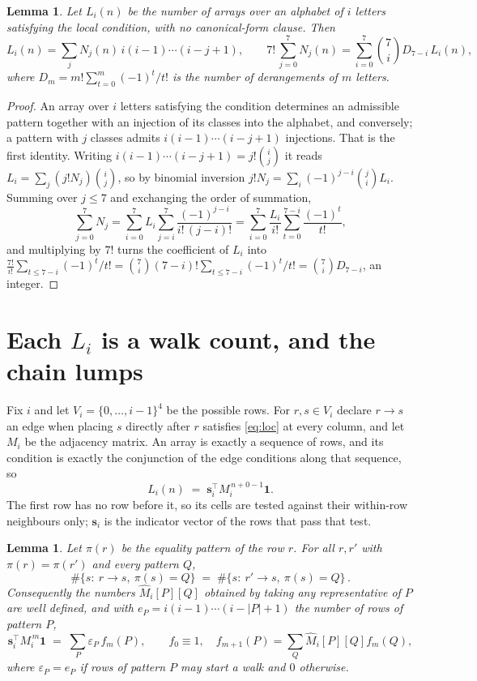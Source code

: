 \documentclass[11pt,a4paper]{article}
\theoremstyle{plain}
\newtheorem{lemma}[theorem]{Lemma}
\theoremstyle{definition}
\begin{document}
\begin{lemma}\label{lem:inv}
Let $L_i(n)$ be the number of arrays over an alphabet of $i$ letters satisfying the local
condition, with no canonical-form clause. Then
\[
L_i(n)=\sum_j N_j(n)\,i(i-1)\cdots(i-j+1),
\qquad
7!\,\sum_{j=0}^{7}N_j(n)=\sum_{i=0}^{7}\binom{7}{i}D_{7-i}\,L_i(n),
\]
where $D_m=m!\sum_{t=0}^{m}(-1)^t/t!$ is the number of derangements of $m$ letters.
\end{lemma}

\begin{proof}
An array over $i$ letters satisfying the condition determines an admissible pattern together
with an injection of its classes into the alphabet, and conversely; a pattern with $j$
classes admits $i(i-1)\cdots(i-j+1)$ injections. That is the first identity. Writing
$i(i-1)\cdots(i-j+1)=j!\binom{i}{j}$ it reads $L_i=\sum_j (j!N_j)\binom{i}{j}$, so by
binomial inversion $j!N_j=\sum_{i}(-1)^{j-i}\binom{j}{i}L_i$. Summing over
$j\le 7$ and exchanging the order of summation,
\[
\sum_{j=0}^{7}N_j=\sum_{i=0}^{7}L_i\sum_{j=i}^{7}\frac{(-1)^{j-i}}{i!\,(j-i)!}
=\sum_{i=0}^{7}\frac{L_i}{i!}\sum_{t=0}^{7-i}\frac{(-1)^t}{t!} ,
\]
and multiplying by $7!$ turns the coefficient of $L_i$ into
$\frac{7!}{i!}\sum_{t\le 7-i}(-1)^t/t!=\binom{7}{i}(7-i)!\sum_{t\le 7-i}(-1)^t/t!
=\binom{7}{i}D_{7-i}$, an integer.
\end{proof}

\section{Each $L_i$ is a walk count, and the chain lumps}

Fix $i$ and let $V_i=\{0,\dots,i-1\}^{4}$ be the possible rows. For $r,s\in V_i$
declare $r\to s$ an edge when placing $s$ directly after $r$ satisfies \eqref{eq:loc} at
every column, and let $M_i$ be the adjacency matrix. An array is exactly a sequence of
rows, and its condition is exactly the conjunction of the edge conditions along that
sequence, so
\[
L_i(n)\;=\;\mathbf{s}_i^{\!\top}M_i^{\,n+0-1}\mathbf{1} .
\]
The first row has no row before it, so its cells are tested
against their within-row neighbours only; $\mathbf{s}_i$ is the indicator vector of the
rows that pass that test.

\begin{lemma}\label{lem:lump}
Let $\pi(r)$ be the equality pattern of the row $r$. For all $r,r'$ with
$\pi(r)=\pi(r')$ and every pattern $Q$,
\[
\#\{s:\ r\to s,\ \pi(s)=Q\}\;=\;\#\{s:\ r'\to s,\ \pi(s)=Q\}\, .
\]
Consequently the numbers $\widehat M_i[P][Q]$ obtained by taking any representative of $P$
are well defined, and with $e_P=i(i-1)\cdots(i-|P|+1)$ the number of rows of pattern $P$,
\[
\mathbf{s}_i^{\!\top}M_i^{\,m}\mathbf{1}\;=\;\sum_P \varepsilon_P\,f_m(P),
\qquad f_0\equiv1,\quad f_{m+1}(P)=\sum_Q\widehat M_i[P][Q]f_m(Q),
\]
where $\varepsilon_P=e_P$ if rows of pattern $P$ may start a walk and $0$ otherwise.
\end{lemma}
\end{document}
